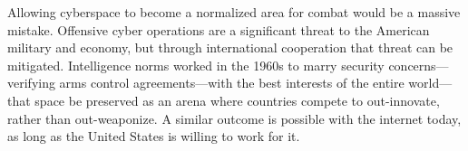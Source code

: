 \documentclass[11pt]{memoir}
\begin{document}
Allowing cyberspace to become a normalized area for combat would be a massive mistake. Offensive cyber operations are a significant threat to the American military and economy, but through international cooperation that threat can be mitigated. Intelligence norms worked in the 1960s to marry security concerns---verifying arms control agreements---with the best interests of the entire world---that space be preserved as an arena where countries compete to out-innovate, rather than out-weaponize. A similar outcome is possible with the internet today, as long as the United States is willing to work for it.









\end{document}
